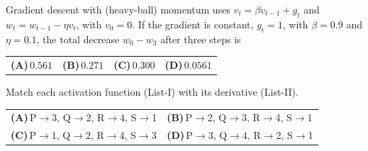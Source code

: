 \documentclass[11pt,a4paper]{article}
\newcommand{\optlabel}[1]{\textbf{(#1)}}
\newenvironment{qitem}[1]{\begin{list}{}{\setlength{\leftmargin}{3.3em}\setlength{\labelwidth}{3.1em}%
  \setlength{\labelsep}{0.2em}\setlength{\topsep}{3pt}\setlength{\parsep}{3pt}}\item[\textbf{Q.#1}\hfill]}{\end{list}}
\newcommand{\qsep}{\par\vspace{2pt}{\color{black!15}\hrule}\vspace{4pt}}
\begin{document}
\begin{qitem}{14}
Gradient descent with (heavy-ball) momentum uses $v_{t} = \beta v_{t-1} + g_t$ and $w_{t} = w_{t-1} - \eta v_t$,
with $v_0 = 0$. If the gradient is constant, $g_t = 1$, with $\beta = 0.9$ and $\eta = 0.1$, the total decrease
$w_0 - w_3$ after three steps is
\par\smallskip\noindent\begin{tabularx}{\linewidth}{@{}*{4}{L}@{}}
\optlabel{A}\,$0.561$ & \optlabel{B}\,$0.271$ & \optlabel{C}\,$0.300$ & \optlabel{D}\,$0.0561$
\end{tabularx}
\end{qitem}
\qsep

\begin{qitem}{15}
Match each activation function (List-I) with its derivative (List-II).
\par\smallskip{}
\par\smallskip\noindent\begin{tabularx}{\linewidth}{@{}*{2}{L}@{}}
\optlabel{A}\,P$\to$3, Q$\to$2, R$\to$4, S$\to$1 & \optlabel{B}\,P$\to$2, Q$\to$3, R$\to$4, S$\to$1 \\[3pt]
\optlabel{C}\,P$\to$1, Q$\to$2, R$\to$4, S$\to$3 & \optlabel{D}\,P$\to$3, Q$\to$4, R$\to$2, S$\to$1
\end{tabularx}
\end{qitem}
\qsep
\end{document}
